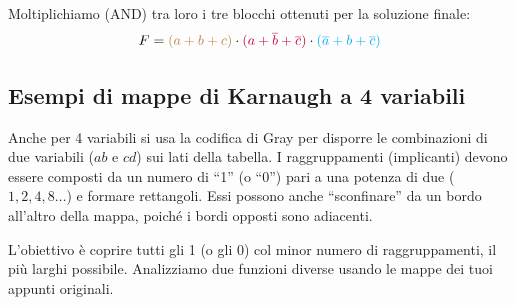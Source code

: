 \documentclass[11pt,a4paper]{report}
\begin{document}
Moltiplichiamo (AND) tra loro i tre blocchi ottenuti per la soluzione finale:
\[ F = \textcolor{brown}{(a+b+c)} \cdot \textcolor{purple}{(a+\overline{b}+\overline{c})} \cdot \textcolor{cyan}{(\overline{a}+b+\overline{c})} \]

\subsection{Esempi di mappe di Karnaugh a 4 variabili}

\noindent Anche per 4 variabili si usa la codifica di Gray per disporre le combinazioni di due variabili ($ab$ e $cd$) sui lati della tabella. I raggruppamenti (implicanti) devono essere composti da un numero di ``1'' (o ``0'') pari a una potenza di due ($1, 2, 4, 8\ldots$) e formare rettangoli. Essi possono anche ``sconfinare'' da un bordo all'altro della mappa, poiché i bordi opposti sono adiacenti. 

L'obiettivo è coprire tutti gli 1 (o gli 0) col minor numero di raggruppamenti, il più larghi possibile. Analizziamo due funzioni diverse usando le mappe dei tuoi appunti originali.
\end{document}
